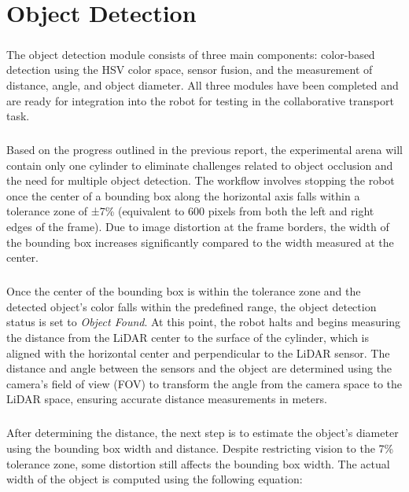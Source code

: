 \chapter{Object Detection}

\paragraph{}
The object detection module consists of three main components: color-based detection using the HSV color space, sensor fusion, and the measurement of distance, angle, and object diameter. All three modules have been completed and are ready for integration into the robot for testing in the collaborative transport task.

\paragraph{}
Based on the progress outlined in the previous report, the experimental arena will contain only one cylinder to eliminate challenges related to object occlusion and the need for multiple object detection. The workflow involves stopping the robot once the center of a bounding box along the horizontal axis falls within a tolerance zone of ±7\% (equivalent to 600 pixels from both the left and right edges of the frame). Due to image distortion at the frame borders, the width of the bounding box increases significantly compared to the width measured at the center.

\paragraph{}
Once the center of the bounding box is within the tolerance zone and the detected object's color falls within the predefined range, the object detection status is set to \textit{Object Found}. At this point, the robot halts and begins measuring the distance from the LiDAR center to the surface of the cylinder, which is aligned with the horizontal center and perpendicular to the LiDAR sensor. The distance and angle between the sensors and the object are determined using the camera's field of view (FOV) to transform the angle from the camera space to the LiDAR space, ensuring accurate distance measurements in meters.

\paragraph{}
After determining the distance, the next step is to estimate the object's diameter using the bounding box width and distance. Despite restricting vision to the 7\% tolerance zone, some distortion still affects the bounding box width. The actual width of the object is computed using the following equation:

